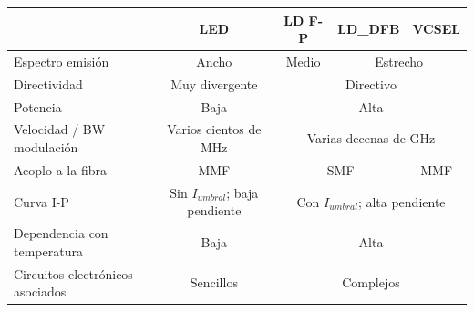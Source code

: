 \begin{itemize}
  		
  		\begin{table}[H]
  			\begin{tabular}{l|c|c|c|c|}
  				\cline{2-5}
  				& \cellcolor[HTML]{EFEFEF}\textbf{LED} & \cellcolor[HTML]{EFEFEF}\textbf{LD F-P} & \cellcolor[HTML]{EFEFEF}\textbf{LD\_DFB} & \cellcolor[HTML]{EFEFEF}\textbf{VCSEL} \\ \hline
  				\multicolumn{1}{|l|}{\cellcolor[HTML]{EFEFEF}Espectro emisión}                 & Ancho                                & Medio                                   & \multicolumn{2}{c|}{Estrecho}                                                     \\ \hline
  				\multicolumn{1}{|l|}{\cellcolor[HTML]{EFEFEF}Directividad}                     & Muy divergente                       & \multicolumn{3}{c|}{Directivo}                                                                                              \\ \hline
  				\multicolumn{1}{|l|}{\cellcolor[HTML]{EFEFEF}Potencia}                         & Baja                                 & \multicolumn{3}{c|}{Alta}                                                                                                   \\ \hline
  				\multicolumn{1}{|l|}{\cellcolor[HTML]{EFEFEF}Velocidad / BW modulación}        & Varios cientos de MHz                & \multicolumn{3}{c|}{Varias decenas de GHz}                                                                                  \\ \hline
  				\multicolumn{1}{|l|}{\cellcolor[HTML]{EFEFEF}Acoplo a la fibra}                & MMF                                  & \multicolumn{2}{c|}{SMF}                                                           & MMF                                    \\ \hline
  				\multicolumn{1}{|l|}{\cellcolor[HTML]{EFEFEF}Curva I-P}                        & Sin $I_{umbral}$; baja pendiente          & \multicolumn{3}{c|}{Con $I_{umbral}$; alta pendiente}                                                                            \\ \hline
  				\multicolumn{1}{|l|}{\cellcolor[HTML]{EFEFEF}Dependencia con temperatura}      & Baja                                 & \multicolumn{3}{c|}{Alta}                                                                                                   \\ \hline
  				\multicolumn{1}{|l|}{\cellcolor[HTML]{EFEFEF}Circuitos electrónicos asociados} & Sencillos                            & \multicolumn{3}{c|}{Complejos}                                                                                              \\ \hline

\end{tabular}
\end{table}
\end{itemize}
